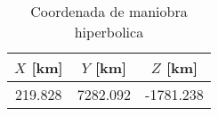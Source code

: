 \begin{table}[H] 
\centering 
\captionsetup{justification=centering,margin=10mm} 
\caption{Coordenada de maniobra hiperbolica} 
	{\renewcommand{\arraystretch}{1.2} 
	\begin{tabular}{ccc} 
		$X$ [km] & $Y$ [km] & $Z$ [km] \\ 
		\hline 
		219.828 & 7282.092 & -1781.238 \\ 
		\hline 
	\end{tabular} 
	} 
\label{tab:pto_h} 
\end{table}